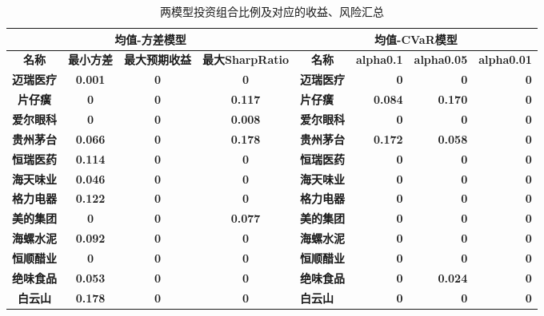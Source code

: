 \documentclass[withoutpreface,bwprint]{cumcmthesis} %
\begin{document}
\begin{table}[H]
	\centering
	\caption{两模型投资组合比例及对应的收益、风险汇总}
	\begin{tabular}{c|ccc|l|rrr}
		\toprule[1.5pt]
		\multicolumn{4}{c|}{\textbf{均值-方差模型}} & \multicolumn{4}{c}{\textbf{均值-CVaR模型}} \\
		\midrule[1.5pt]
		\textbf{名称} & \textbf{最小方差} & \textbf{最大预期收益} & \textbf{最大SharpRatio} & \multicolumn{1}{c|}{\textbf{名称}} & \multicolumn{1}{c}{\textbf{alpha0.1}} & \multicolumn{1}{c}{\textbf{alpha0.05}} & \multicolumn{1}{c}{\textbf{alpha0.01}} \\
		\midrule
		\textbf{迈瑞医疗} & \textbf{0.001} & \textbf{0} & \textbf{0} & \textbf{迈瑞医疗} & \textbf{0} & \textbf{0} & \textbf{0} \\
		\textbf{片仔癀} & \textbf{0} & \textbf{0} & \textbf{0.117} & \textbf{片仔癀} & \textbf{0.084} & \textbf{0.170} & \textbf{0} \\
		\textbf{爱尔眼科} & \textbf{0} & \textbf{0} & \textbf{0.008} & \textbf{爱尔眼科} & \textbf{0} & \textbf{0} & \textbf{0} \\
		\textbf{贵州茅台} & \textbf{0.066} & \textbf{0} & \textbf{0.178} & \textbf{贵州茅台} & \textbf{0.172} & \textbf{0.058} & \textbf{0} \\
		\textbf{恒瑞医药} & \textbf{0.114} & \textbf{0} & \textbf{0} & \textbf{恒瑞医药} & \textbf{0} & \textbf{0} & \textbf{0} \\
		\textbf{海天味业} & \textbf{0.046} & \textbf{0} & \textbf{0} & \textbf{海天味业} & \textbf{0} & \textbf{0} & \textbf{0} \\
		\textbf{格力电器} & \textbf{0.122} & \textbf{0} & \textbf{0} & \textbf{格力电器} & \textbf{0} & \textbf{0} & \textbf{0} \\
		\textbf{美的集团} & \textbf{0} & \textbf{0} & \textbf{0.077} & \textbf{美的集团} & \textbf{0} & \textbf{0} & \textbf{0} \\
		\textbf{海螺水泥} & \textbf{0.092} & \textbf{0} & \textbf{0} & \textbf{海螺水泥} & \textbf{0} & \textbf{0} & \textbf{0} \\
		\textbf{恒顺醋业} & \textbf{0} & \textbf{0} & \textbf{0} & \textbf{恒顺醋业} & \textbf{0} & \textbf{0} & \textbf{0} \\
		\textbf{绝味食品} & \textbf{0.053} & \textbf{0} & \textbf{0} & \textbf{绝味食品} & \textbf{0} & \textbf{0.024} & \textbf{0} \\
		\textbf{白云山} & \textbf{0.178} & \textbf{0} & \textbf{0} & \textbf{白云山} & \textbf{0} & \textbf{0} & \textbf{0} \\

\end{tabular}
\end{table}
\end{document}
